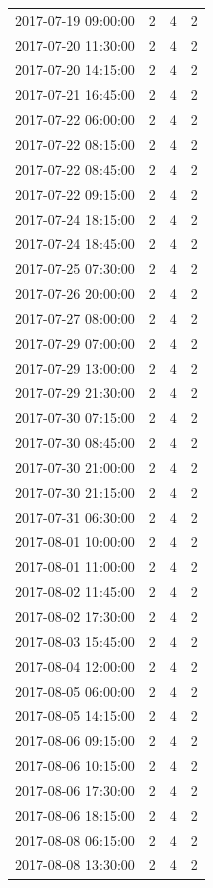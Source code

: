 \begin{tabular}{lrrr}
2017-07-19 09:00:00 & 2 & 4 & 2 \\
2017-07-20 11:30:00 & 2 & 4 & 2 \\
2017-07-20 14:15:00 & 2 & 4 & 2 \\
2017-07-21 16:45:00 & 2 & 4 & 2 \\
2017-07-22 06:00:00 & 2 & 4 & 2 \\
2017-07-22 08:15:00 & 2 & 4 & 2 \\
2017-07-22 08:45:00 & 2 & 4 & 2 \\
2017-07-22 09:15:00 & 2 & 4 & 2 \\
2017-07-24 18:15:00 & 2 & 4 & 2 \\
2017-07-24 18:45:00 & 2 & 4 & 2 \\
2017-07-25 07:30:00 & 2 & 4 & 2 \\
2017-07-26 20:00:00 & 2 & 4 & 2 \\
2017-07-27 08:00:00 & 2 & 4 & 2 \\
2017-07-29 07:00:00 & 2 & 4 & 2 \\
2017-07-29 13:00:00 & 2 & 4 & 2 \\
2017-07-29 21:30:00 & 2 & 4 & 2 \\
2017-07-30 07:15:00 & 2 & 4 & 2 \\
2017-07-30 08:45:00 & 2 & 4 & 2 \\
2017-07-30 21:00:00 & 2 & 4 & 2 \\
2017-07-30 21:15:00 & 2 & 4 & 2 \\
2017-07-31 06:30:00 & 2 & 4 & 2 \\
2017-08-01 10:00:00 & 2 & 4 & 2 \\
2017-08-01 11:00:00 & 2 & 4 & 2 \\
2017-08-02 11:45:00 & 2 & 4 & 2 \\
2017-08-02 17:30:00 & 2 & 4 & 2 \\
2017-08-03 15:45:00 & 2 & 4 & 2 \\
2017-08-04 12:00:00 & 2 & 4 & 2 \\
2017-08-05 06:00:00 & 2 & 4 & 2 \\
2017-08-05 14:15:00 & 2 & 4 & 2 \\
2017-08-06 09:15:00 & 2 & 4 & 2 \\
2017-08-06 10:15:00 & 2 & 4 & 2 \\
2017-08-06 17:30:00 & 2 & 4 & 2 \\
2017-08-06 18:15:00 & 2 & 4 & 2 \\
2017-08-08 06:15:00 & 2 & 4 & 2 \\
2017-08-08 13:30:00 & 2 & 4 & 2 \\

\end{tabular}
